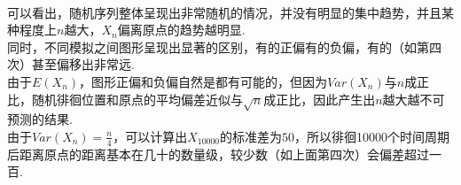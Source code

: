 \documentclass{article}
\begin{document}
\begin{CJK}{UTF8}{gbsn}
\begin{minipage}{0.5\textwidth}
\end{minipage}
\\
可以看出，随机序列整体呈现出非常随机的情况，并没有明显的集中趋势，并且某种程度上$n$越大，$X_{n}$偏离原点的趋势越明显.
\\同时，不同模拟之间图形呈现出显著的区别，有的正偏有的负偏，有的（如第四次）甚至偏移出非常远.
\\由于$E(X_{n})$，图形正偏和负偏自然是都有可能的，但因为$Var(X_{n})$与$n$成正比，随机徘徊位置和原点的平均偏差近似与$\sqrt{n}$成正比，因此产生出$n$越大越不可预测的结果.
\\由于$Var(X_{n})=\frac{n}{4}$，可以计算出$X_{10000}$的标准差为$50$，所以徘徊10000个时间周期后距离原点的距离基本在几十的数量级，较少数（如上面第四次）会偏差超过一百.
\end{CJK}
\end{document}
